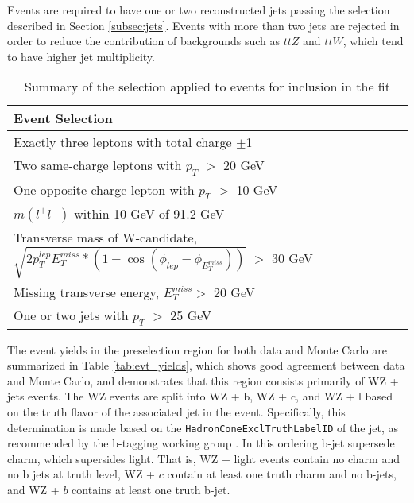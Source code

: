 Events are required to have one or two reconstructed jets passing the selection described in Section \ref{subsec:jets}. Events with more than two jets are rejected in order to reduce the contribution of backgrounds such as $t\bar{t}Z$ and $t\bar{t}W$, which tend to have higher jet multiplicity. 

\begin{table}[H] 
    \centering
    \begin{tabular}{l}
        \hline\hline
        Event Selection\\
        \hline 
        Exactly three leptons with total charge $\pm$1 \\
        Two same-charge leptons with $p_T$ $>$ 20 GeV \\
        One opposite charge lepton with $p_T$ $>$ 10 GeV \\
        $m(l^+l^-)$ within 10 GeV of 91.2 GeV \\
        Transverse mass of W-candidate, $\sqrt{2p_T^{lep}E^{miss}_T*(1-\cos(\phi_{lep}-\phi_{E^{miss}_T}))}$ $>$ 30 GeV \\
        Missing transverse energy, $E_T^{miss} >$ 20 GeV \\
        One or two jets with $p_T$ $>$ 25 GeV \\
        \hline\hline
    \end{tabular}
    \caption{Summary of the selection applied to events for inclusion in the fit}
    \label{tbl:selection}
\end{table}

The event yields in the preselection region for both data and Monte Carlo are summarized in Table \ref{tab:evt_yields}, which shows good agreement between data and Monte Carlo, and demonstrates that this region consists primarily of WZ + jets events. The WZ events are split into WZ + b, WZ + c, and WZ + l based on the truth flavor of the associated jet in the event. Specifically, this determination is made based on the \verb!HadronConeExclTruthLabelID! of the jet, as recommended by the b-tagging working group \cite{BtagWG}. In this ordering b-jet supersede charm, which supersides light. That is, WZ + light events contain no charm and no b jets at truth level, WZ + $c$ contain at least one truth charm and no b-jets, and WZ + $b$ contains at least one truth b-jet. 

\begin{table}[H] 
    \centering
        
    \label{tab:evt_yields}
\end{table}

